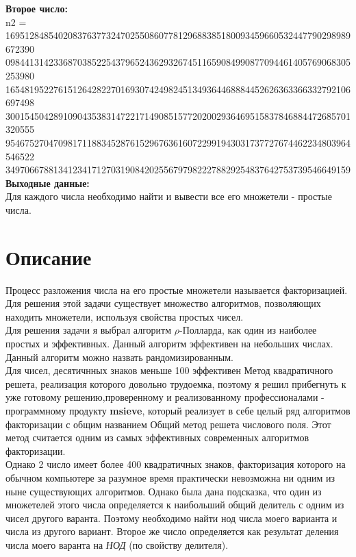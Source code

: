 \documentclass[pdf, unicode, 12pt, a4paper,oneside,fleqn]{article}
\begin{document}
{\bfseries Второе число:} \\

n2 = \\
169512848540208376377324702550860778129688385180093459660532447790298989672390\\
098441314233687038522543796524362932674511659084990877094461405769068305253980\\
165481952276151264282270169307424982451349364468884452626363366332792106697498\\
300154504289109043538314722171490851577202002936469515837846884472685701320555\\
954675270470981711883452876152967636160722991943031737727674462234803964546522\\
349706678813412341712703190842025567979822278829254837642753739546649159 \\

{\bfseries Выходные данные:} \\
Для каждого числа необходимо найти и  вывести все его множетели - простые числа.

\pagebreak

\section{Описание}

Процесс разложения числа на его простые множетели называется факторизацией. Для решения этой задачи существует множество алгоритмов, позволяющих находить множетели, используя свойства простых чисел. \\

Для решения задачи я выбрал алгоритм $\rho$-Полларда, как один из наиболее простых и эффективных. Данный алгоритм эффективен на небольших числах. Данный алгоритм можно назвать рандомизированным. \\

Для чисел, десятичнных знаков меньше 100 эффективен Метод квадратичного решета, реализация которого довольно трудоемка, поэтому я решил прибегнуть к уже готовому решению,проверенному и реализованному профессионалами - программному продукту {\bfseries msieve}, который реализует в себе целый ряд алгоритмов факторизации с общим названием Общий метод решета числового поля. Этот метод считается одним из самых эффективных современных алгоритмов факторизации. \\

Однако 2 число имеет более 400 квадратичных знаков, факторизация которого на обычном компьютере за разумное время практически невозможна ни одним из ныне существующих алгоритмов. Однако была дана подсказка, что один из множетелей этого числа определяется к наибольший общий делитель с одним из чисел другого варанта. Поэтому необходимо найти нод числа моего варианта и числа из другого вариант.
Второе же число определяется как результат деления числа моего варанта на {\it НОД} (по свойству делителя). \\
\end{document}

